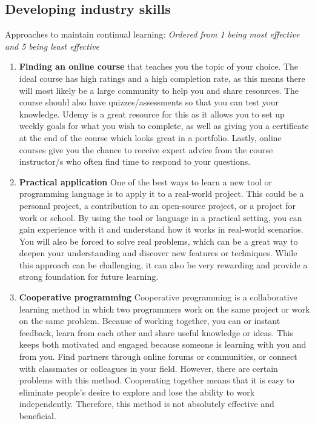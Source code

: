 \documentclass[a4paper, 11pt]{report}
\begin{document}
\subsection{Developing industry skills}


Approaches to maintain continual learning:
\emph{Ordered from 1 being most effective and 5 being least effective}
\begin{enumerate}
    \item \textbf{Finding an online course} that teaches you the topic of your choice. The ideal course has high ratings and a high completion rate, as this means there will most likely be a large community to help you and share resources. The course should also have quizzes/assessments so that you can test your knowledge. Udemy is a great resource for this as it allows you to set up weekly goals for what you wish to complete, as well as giving you a certificate at the end of the course which looks great in a portfolio. Lastly, online courses give you the chance to receive expert advice from the course instructor/s who often find time to respond to your questions.
    \item \textbf{Practical application} One of the best ways to learn a new tool or programming language is to apply it to a real-world project. This could be a personal project, a contribution to an open-source project, or a project for work or school. By using the tool or language in a practical setting, you can gain experience with it and understand how it works in real-world scenarios. You will also be forced to solve real problems, which can be a great way to deepen your understanding and discover new features or techniques. While this approach can be challenging, it can also be very rewarding and provide a strong foundation for future learning.
    \item \textbf{Cooperative programming} Cooperative programming is a collaborative learning method in which two programmers work on the same project or work on the same problem. Because of working together, you can or instant feedback, learn from each other and share useful knowledge or ideas. This keeps both motivated and engaged because someone is learning with you and from you. Find partners through online forums or communities, or connect with classmates or colleagues in your field. However, there are certain problems with this method. Cooperating together means that it is easy to eliminate people's desire to explore and lose the ability to work independently. Therefore, this method is not absolutely effective and beneficial.

\end{enumerate}
\end{document}
